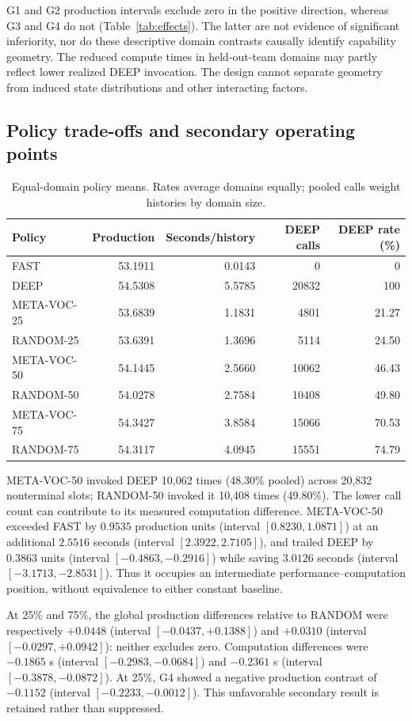 \documentclass[11pt]{article}
\begin{document}
G1 and G2 production intervals exclude zero in the positive direction, whereas G3 and G4 do not (Table~\ref{tab:effects}). The latter are not evidence of significant inferiority, nor do these descriptive domain contrasts causally identify capability geometry. The reduced compute times in held-out-team domains may partly reflect lower realized DEEP invocation. The design cannot separate geometry from induced state distributions and other interacting factors.

\subsection{Policy trade-offs and secondary operating points}
\begin{table}[ht]\centering\caption{Equal-domain policy means. Rates average domains equally; pooled calls weight histories by domain size.}\label{tab:policies}\small\begin{tabular}{lrrrr}\toprule Policy & Production & Seconds/history & DEEP calls & DEEP rate (\%)\\\midrule FAST & 53.1911 & 0.0143 & 0 & 0\\ DEEP & 54.5308 & 5.5785 & 20832 & 100\\ META-VOC-25 & 53.6839 & 1.1831 & 4801 & 21.27\\ RANDOM-25 & 53.6391 & 1.3696 & 5114 & 24.50\\ META-VOC-50 & 54.1445 & 2.5660 & 10062 & 46.43\\ RANDOM-50 & 54.0278 & 2.7584 & 10408 & 49.80\\ META-VOC-75 & 54.3427 & 3.8584 & 15066 & 70.53\\ RANDOM-75 & 54.3117 & 4.0945 & 15551 & 74.79\\\bottomrule\end{tabular}\end{table}

META-VOC-50 invoked DEEP 10,062 times (48.30\% pooled) across 20,832 nonterminal slots; RANDOM-50 invoked it 10,408 times (49.80\%). The lower call count can contribute to its measured computation difference. META-VOC-50 exceeded FAST by $0.9535$ production units (interval $[0.8230,1.0871]$) at an additional $2.5516$ seconds (interval $[2.3922,2.7105]$), and trailed DEEP by $0.3863$ units (interval $[-0.4863,-0.2916]$) while saving $3.0126$ seconds (interval $[-3.1713,-2.8531]$). Thus it occupies an intermediate performance--computation position, without equivalence to either constant baseline.

At 25\% and 75\%, the global production differences relative to RANDOM were respectively $+0.0448$ (interval $[-0.0437,+0.1388]$) and $+0.0310$ (interval $[-0.0297,+0.0942]$): neither excludes zero. Computation differences were $-0.1865$ s (interval $[-0.2983,-0.0684]$) and $-0.2361$ s (interval $[-0.3878,-0.0872]$). At 25\%, G4 showed a negative production contrast of $-0.1152$ (interval $[-0.2233,-0.0012]$). This unfavorable secondary result is retained rather than suppressed.
\end{document}
